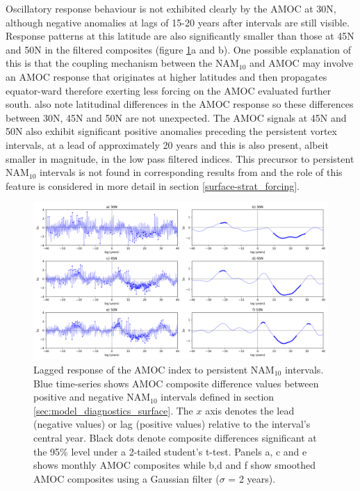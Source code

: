 Oscillatory response behaviour is not exhibited clearly by the AMOC at 30N, although negative anomalies at lags of 15-20 years after intervals are still visible. Response patterns at this latitude are also significantly smaller than those at 45N and 50N in the filtered composites (figure \ref{AMOC_comp_NAM}a and b). One possible explanation of this is that the coupling mechanism between the NAM$_{10}$ and AMOC may involve an AMOC response that originates at higher latitudes and then propagates equator-ward therefore exerting less forcing on the AMOC evaluated further south. \cite{zhangLatitudinal2010b} also note latitudinal differences in the AMOC response so these differences between 30N, 45N and 50N are not unexpected. The AMOC signals at 45N and 50N also exhibit significant positive anomalies preceding the persistent vortex intervals, at a lead of approximately 20 years and this is also present, albeit smaller in magnitude, in the low pass filtered indices. This precursor to persistent NAM$_{10}$ intervals is not found in corresponding results from \cite{reichlerStratospheric2012b} and the role of this feature is considered in more detail in section \ref{surface-strat_forcing}.

\begin{center}
\begin{figure}[h!]
\noindent\includegraphics[width = \linewidth]{Figures/Figures-surface/AMOC_responses_low_and_highf_combined_FINAL.png} 
\caption[Lagged response of the AMOC index to persistent NAM$_{10}$ intervals.]{Lagged response of the AMOC index to persistent NAM$_{10}$ intervals. Blue time-series shows AMOC composite difference values between positive and negative NAM$_{10}$ intervals defined in section \ref{sec:model_diagnostics_surface}. The $x$ axis denotes the lead (negative values) or lag (positive values) relative to the interval's central year. Black dots denote composite differences significant at the 95\% level under a 2-tailed student's t-test. Panels a, c and e shows monthly AMOC composites while b,d and f show smoothed AMOC composites using a Gaussian filter ($\sigma$ = 2 years).}
\label{AMOC_comp_NAM}
\end{figure}
\end{center}

